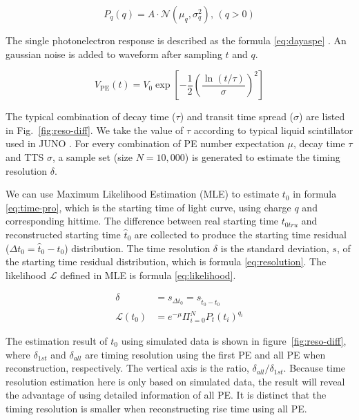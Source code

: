 \begin{equation}
    P_{q}(q) = A\cdot\mathcal{N}(\mu_{q},\sigma_{q}^{2}),\,(q>0)
    \label{eq:truncated}
\end{equation}

The single photonelectron response is described as the formula \eqref{eq:dayaspe} \cite{jetter_pmt_2012}. An gaussian noise is added to waveform after sampling $t$ and $q$. 

\begin{equation}
    V_\mathrm{PE}(t) = V_{0}\exp\left[-\frac{1}{2}\left(\frac{\ln(t/\tau)}{\sigma}\right)^{2}\right]
    \label{eq:dayaspe}
\end{equation}

The typical combination of decay time ($\tau$) and transit time spread ($\sigma$) are listed in Fig.~\ref{fig:reso-diff}. We take the value of $\tau$ according to typical liquid scintillator used in JUNO \cite{ludhova_particle_2020}. For every combination of PE number expectation $\mu$, decay time $\tau$ and TTS $\sigma$, a sample set (size $N=10,000$) is generated to estimate the timing resolution $\delta$. 

We can use Maximum Likelihood Estimation (MLE) to estimate $t_{0}$ in formula \eqref{eq:time-pro}, which is the starting time of light curve, using charge $q$ and corresponding hittime. The difference between real starting time $t_{0tru}$ and reconstructed starting time $\hat{t}_0$ are collected to produce the starting time residual ($\Delta t_{0}=\hat{t}_0-t_0$) distribution. The time resolution $\delta$ is the standard deviation, $s$, of the starting time residual distribution, which is formula \eqref{eq:resolution}. The likelihood $\mathcal{L}$ defined in MLE is formula \eqref{eq:likelihood}. 

\begin{align}
  \delta &= s_{\Delta t_{0}} = s_{\hat{t}_0-t_0} \label{eq:resolution} \\
  \mathcal{L}(t_{0}) &= e^{-\mu}\Pi_{i=0}^{N}P_{t}(t_{i})^{q_{i}} \label{eq:likelihood}
\end{align}

The estimation result of $t_{0}$ using simulated data is shown in figure~\ref{fig:reso-diff}, where $\delta_{1st}$ and $\delta_{all}$ are timing resolution using the first PE and all PE when reconstruction, respectively. The vertical axis is the ratio, $\delta_{all}/\delta_{1st}$. Because time resolution estimation here is only based on simulated data, the result will reveal the advantage of using detailed information of all PE. It is distinct that the timing resolution is smaller when reconstructing rise time using all PE. 

